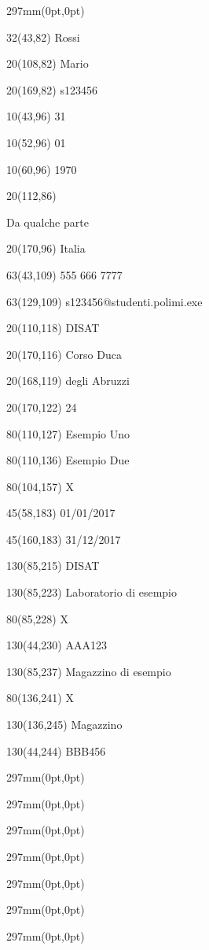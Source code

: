 \documentclass[a4paper,oneside]{article}
\newcommand{\text}[4]{\begin{textblock}{#3}(#2,#1)
{\large #4}
\end{textblock}}
\newcommand{\insertpage}[1]{\begin{textblock*}{297mm}(0pt,0pt)%
	\end{textblock*}%
}
\begin{document}
	\insertpage{1}
	\text{82}{43}{32}{Rossi} %
	\text{82}{108}{20}{Mario} %
	\text{82}{169}{20}{s123456} %
	\text{96}{43}{10}{31} %
	\text{96}{52}{10}{01} %
	\text{96}{60}{10}{1970} %
	\text{86}{112}{20}{\begin{flushright}Da qualche parte\end{flushright} %
	}
	\text{96}{170}{20}{Italia} %
	\text{109}{43}{63}{555 666 7777} %
	\text{109}{129}{63}{s123456@studenti.polimi.exe} %
	
	\text{118}{110}{20}{DISAT} %
	\text{116}{170}{20}{\small Corso Duca} %
	\text{119}{168}{20}{\small degli Abruzzi}
	\text{122}{170}{20}{\small 24}
	\text{127}{110}{80}{Esempio Uno} %
	\text{136}{110}{80}{Esempio Due} %

	\text{157}{104}{80}{\Large X} %
	\text{183}{58}{45}{01/01/2017} %
	\text{183}{160}{45}{31/12/2017} %
	
	\text{215}{85}{130}{DISAT} %
	
	\text{223}{85}{130}{Laboratorio di esempio} %
	\text{228}{85}{80}{\Large X} %
	\text{230}{44}{130}{AAA123} %
	
	\text{237}{85}{130}{Magazzino di esempio} %
	\text{241}{136}{80}{\Large X} %
	\text{245}{136}{130}{Magazzino} %
	\text{244}{44}{130}{BBB456} %
	
	\newpage
	\insertpage{2}
	
	\newpage
	\insertpage{3}
	
	\newpage
	\insertpage{4}
	
	\newpage
	\insertpage{5}
	
	\newpage
	\insertpage{6}
	
	\newpage
	\insertpage{7}
	
	\newpage
	\insertpage{8}
\end{document}
